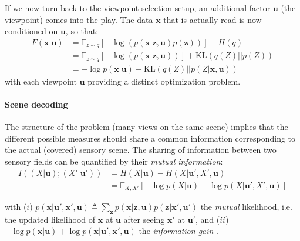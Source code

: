 \documentclass{article}
\begin{document}
If we now turn back to the viewpoint selection setup, an additional factor $\boldsymbol{u}$ (the viewpoint) comes into the play. The data $\boldsymbol{x}$ that is actually read is now conditioned on  $\boldsymbol{u}$, so that:
\begin{align}
F(\boldsymbol{x}|\boldsymbol{u}) 
&= \mathbb{E}_{z\sim q} \left[-\log (p(\boldsymbol{x}|\boldsymbol{z},\boldsymbol{u})p(\boldsymbol{z}))\right] - H(q)\\
&= \mathbb{E}_{z\sim q} \left[-\log (p(\boldsymbol{x}|\boldsymbol{z},\boldsymbol{u}))\right] +\text{KL}(q(Z)||p(Z))
\label{eq:FEP-prior-u}\\
&= - \log p(\boldsymbol{x}|\boldsymbol{u}) + \text{KL}(q(Z)||p(Z|\boldsymbol{x}, \boldsymbol{u}))
\label{eq:FEP-posterior-u}\end{align}
with each viewpoint $\boldsymbol{u}$ providing a distinct optimization problem. 

\paragraph{Scene decoding}
The structure of the problem (many views on the same scene) implies that the different possible measures should share a common information corresponding to the actual (covered) sensory scene. The sharing of information between two sensory fields can be quantified by their \emph{mutual information}:
\begin{align}
I((X| \boldsymbol{u}); (X'| \boldsymbol{u}')) &= H(X| \boldsymbol{u}) - H(X| \boldsymbol{u}', X', \boldsymbol{u})\\
&= \mathbb{E}_{X,X'} \left[-\log p(X| \boldsymbol{u}) + \log p(X| \boldsymbol{u}', X', \boldsymbol{u})\right] \nonumber
\end{align}

with 
($i$) $ p(\boldsymbol{x}| \boldsymbol{u}', \boldsymbol{x}', \boldsymbol{u}) \triangleq \sum_{\boldsymbol{z}} p(\boldsymbol{x}|\boldsymbol{z}, \boldsymbol{u}) p(\boldsymbol{z}|\boldsymbol{x}', \boldsymbol{u}')$ 
the \emph{mutual} likelihood, i.e. the updated likelihood of $\boldsymbol{x}$ at $\boldsymbol{u}$ after seeing $\boldsymbol{x}'$ at $\boldsymbol{u}'$,
and ($ii$) 
$-\log p(\boldsymbol{x}| \boldsymbol{u}) + \log p(\boldsymbol{x}| \boldsymbol{u}', \boldsymbol{x}', \boldsymbol{u})$ the 
\emph{information gain} \citep{tishby2011information}.
\end{document}
